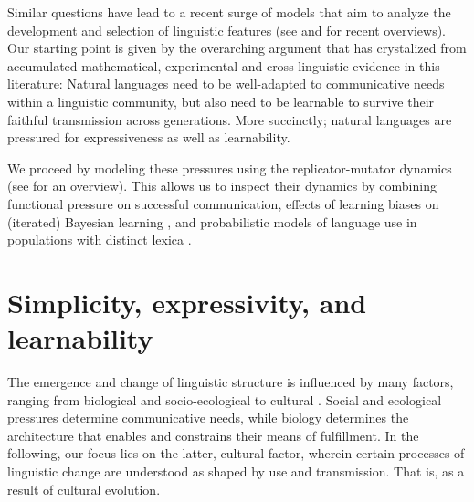 \documentclass[a4paper]{article}
\begin{document}
Similar questions have lead to a recent surge of models that aim to analyze the development and selection of linguistic features (see \citealt{steels:2015} and \citealt{tamariz+kirby:2016} for recent overviews). Our starting point is given by the overarching argument that has crystalized from accumulated mathematical, experimental and cross-linguistic evidence in this literature: Natural languages need to be well-adapted to communicative needs within a linguistic community, but also need to be learnable to survive their faithful transmission across generations. More succinctly; natural languages are pressured for expressiveness as well as learnability.  

We proceed by modeling these pressures using the replicator-mutator dynamics (see \citealt{hofbauer+sigmund:2003} for an overview). This allows us to inspect their dynamics by combining functional pressure on successful communication, effects of learning biases on (iterated) Bayesian learning \citep{griffiths+kalish:2007}, and  probabilistic models of language use in populations with distinct lexica \citep{frank+goodman:2012,franke+jaeger:2014, bergen+etal:2016}. 




\section{Simplicity, expressivity, and learnability}

The emergence and change of linguistic structure is influenced by many factors, ranging from biological and socio-ecological to cultural \citep{steels:2011,tamariz+kirby:2016}. Social and ecological pressures determine communicative needs, while biology determines the architecture that enables and constrains their means of fulfillment. In the following, our focus lies on the latter, cultural factor, wherein certain processes of linguistic change are understood as shaped by use and transmission. That is, as a result of cultural evolution.
\end{document}

